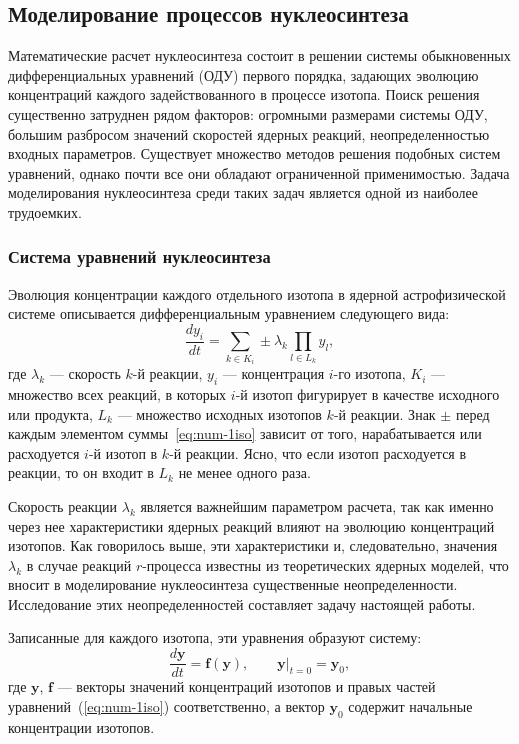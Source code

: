 \subsection{Моделирование процессов нуклеосинтеза}
Математические расчет нуклеосинтеза состоит в решении системы обыкновенных дифференциальных уравнений (ОДУ) первого порядка, задающих эволюцию концентраций каждого задействованного в процессе изотопа. Поиск решения существенно затруднен рядом факторов: огромными размерами системы ОДУ, большим разбросом значений скоростей ядерных реакций, неопределенностью входных параметров. Существует множество методов решения подобных систем уравнений, однако почти все они обладают ограниченной применимостью. Задача моделирования нуклеосинтеза среди таких задач является одной из наиболее трудоемких.

\subsubsection{Система уравнений нуклеосинтеза}
Эволюция концентрации каждого отдельного изотопа в ядерной астрофизической системе описывается дифференциальным уравнением следующего вида:
\begin{equation}
\displaystyle \frac{d y_i}{d t} = \sum_{k \in K_i} \pm \lambda_k \prod_{l \in L_k} y_l,
\label{eq:num-1iso}
\end{equation}
где $\lambda_k$ --- скорость $k$-й реакции, $y_i$ --- концентрация $i$-го изотопа,  $K_i$ --- множество всех реакций, в которых $i$-й изотоп фигурирует в качестве исходного или продукта, $L_k$ --- множество исходных изотопов $k$-й реакции. Знак $\pm$ перед каждым элементом суммы~\ref{eq:num-1iso} зависит от того, нарабатывается или расходуется $i$-й изотоп в $k$-й реакции. Ясно, что если изотоп расходуется в реакции, то он входит в $L_k$ не менее одного раза.

Скорость реакции $\lambda_k$ является важнейшим параметром расчета, так как именно через нее характеристики ядерных реакций влияют на эволюцию концентраций изотопов. Как говорилось выше, эти характеристики и, следовательно, значения $\lambda_k$ в случае реакций $r$-процесса известны из теоретических ядерных моделей, что вносит в моделирование нуклеосинтеза существенные неопределенности. Исследование этих неопределенностей составляет задачу настоящей работы.

Записанные для каждого изотопа, эти уравнения образуют систему:
\begin{equation}
\displaystyle
\frac{d \pmb{y}}{d t} = \pmb{f}(\pmb{y}), \qquad \pmb{y} \bigg\rvert_{t=0} = \pmb{y}_0,
\label{eq:num-system}
\end{equation}
где $\pmb{y}$, $\pmb{f}$ --- векторы значений концентраций изотопов и правых частей уравнений~(\ref{eq:num-1iso}) соответственно, а вектор $\pmb{y}_0$ содержит начальные концентрации изотопов. 

